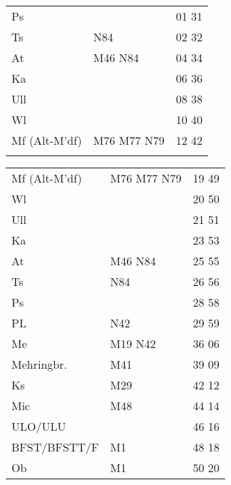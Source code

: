 \begin{tabular}{!{\color{schiefergrau}\vrule width 3pt}*{3}{l!{\color{schiefergrau}\vrule width 3pt}}}
Ps           &                                     & 01 31 \\
Ts           & \nbus{} N84                         & 02 32 \\
At           & \mbus{} M46 \nbus{} N84             & 04 34 \\
Ka           &                                     & 06 36 \\
Ull          &                                     & 08 38 \\
Wl           &                                     & 10 40 \\
Mf (Alt-M'df)& \mbus{} M76 M77 \nbus{} N79         & 12 42 \\
\myhline
\end{tabular}
%
\begin{tabular}{!{\color{schiefergrau}\vrule width 3pt}*{3}{l!{\color{schiefergrau}\vrule width 3pt}}}
\hline
{}
 \\
\hline
Mf (Alt-M'df)& \mbus{} M76 M77 \nbus{} N79         & 19 49 \\
Wl           &                                     & 20 50 \\
Ull          &                                     & 21 51 \\
Ka           &                                     & 23 53 \\
At           & \mbus{} M46 \nbus{} N84             & 25 55 \\
Ts           & \nbus{} N84                         & 26 56 \\
Ps           &                                     & 28 58 \\
PL           & \nbus{} N42                         & 29 59 \\
Me           & \nusieben{} \mbus{} M19 \nbus{} N42 & 36 06 \\
Mehringbr.   & \nueins{} \mbus{} M41               & 39 09 \\
Ks           & \mbus{} M29                         & 42 12 \\
Mic          & \mbus{} M48                         & 44 14 \\
ULO/ULU      & \nuzwei{}                           & 46 16 \\
BFST/BFSTT/F & \mtram{} M1                         & 48 18 \\
Ob           & \mtram{} M1                         & 50 20 \\

\end{tabular}
